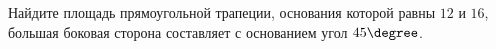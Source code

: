 \begin{ex}
	\begin{condition}
		Найдите площадь прямоугольной трапеции, основания которой равны \( 12  \) и \( 16 \), большая боковая сторона составляет с основанием угол \( 45 \degree\).
	\end{condition}
\end{ex}